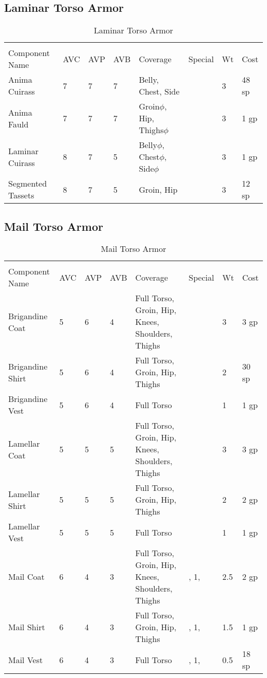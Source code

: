 \documentclass[oneside,11pt,english]{book}
\begin{document}
\subsection{Laminar Torso Armor}
\begin{longtabu} to 
	\captionsetup{textformat=empty, labelformat=blank}
	\caption{Laminar Torso Armor} \vspace{-15pt}
	\label{tab:Laminar Torso Armor}\\
Component Name&AVC&AVP&AVB& Coverage& Special& Wt&Cost\\\toprule
Anima Cuirass& 7& 7& 7& Belly, Chest, Side& & 3& 48 sp\\
Anima Fauld& 7& 7& 7& Groin\hyperref[sec:Weak Spots]{$\phi$}, Hip, Thighs\hyperref[sec:Weak Spots]{$\phi$}& & 3& 1 gp\\
Laminar Cuirass& 8& 7& 5& Belly\hyperref[sec:Weak Spots]{$\phi$}, Chest\hyperref[sec:Weak Spots]{$\phi$}, Side\hyperref[sec:Weak Spots]{$\phi$}& & 3& 1 gp\\
Segmented Tassets& 8& 7& 5& Groin, Hip& & 3& 12 sp\\
\end{longtabu}
\subsection{Mail Torso Armor}
\begin{longtabu} to 
	\captionsetup{textformat=empty, labelformat=blank}
	\caption{Mail Torso Armor} \vspace{-15pt}
	\label{tab:Mail Torso Armor}\\
Component Name&AVC&AVP&AVB& Coverage& Special& Wt&Cost\\\toprule
Brigandine Coat& 5& 6& 4& Full Torso, Groin, Hip, Knees, Shoulders, Thighs& & 3& 3 gp\\
Brigandine Shirt& 5& 6& 4& Full Torso, Groin, Hip, Thighs& & 2& 30 sp\\
Brigandine Vest& 5& 6& 4& Full Torso& & 1& 1 gp\\
Lamellar Coat& 5& 5& 5& Full Torso, Groin, Hip, Knees, Shoulders, Thighs& & 3& 3 gp\\
Lamellar Shirt& 5& 5& 5& Full Torso, Groin, Hip, Thighs& & 2& 2 gp\\
Lamellar Vest& 5& 5& 5& Full Torso& & 1& 1 gp\\
Mail Coat& 6& 4& 3& Full Torso, Groin, Hip, Knees, Shoulders, Thighs& ,  1, & 2.5& 2 gp\\
Mail Shirt& 6& 4& 3& Full Torso, Groin, Hip, Thighs& ,  1, & 1.5& 1 gp\\
Mail Vest& 6& 4& 3& Full Torso& ,  1, & 0.5& 18 sp\\
\end{longtabu}
\end{document}
